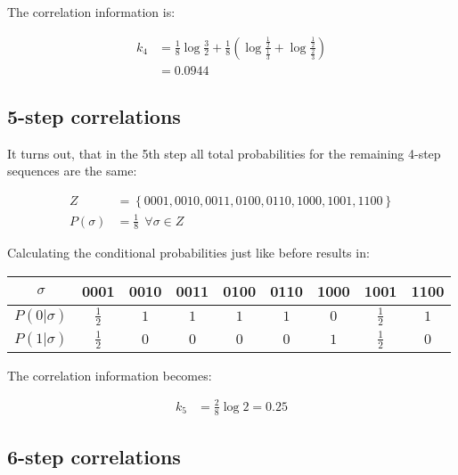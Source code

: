 \documentclass[12pt]{scrartcl}
\begin{document}
The correlation information is:

\begin{equation}\begin{aligned}
k_4 &= \frac{1}{8} \log \frac{3}{2}
+ \frac{1}{8} \left( \log \frac{\frac{1}{2}}{\frac{1}{3}} + \log \frac{\frac{1}{2}}{\frac{2}{3}} \right)\\
&= 0.0944
\end{aligned}\end{equation}

\subsection{5-step correlations}

It turns out, that in the 5th step all total probabilities for the remaining 4-step sequences are the same:

\begin{equation}\begin{aligned}
Z &= \left\{
0001, 0010, 0011, 0100, 0110, 1000, 1001, 1100
\right\}\\
P(\sigma) &= \frac{1}{8} \ \ \forall \sigma \in Z
\end{aligned}\end{equation}

Calculating the conditional probabilities just like before results in:

\begin{table}[!h]
\centering
\begin{tabular}{c||c|c|c|c|c|c|c|c}
$\sigma$ & 0001 & 0010 & 0011 & 0100 & 0110 & 1000 & 1001 & 1100\\ \hline
$P(0|\sigma)$ & $\frac{1}{2}$ & $1$ & $1$ & $1$ & $1$ & $0$ & $\frac{1}{2}$ & $1$\\ \hline
$P(1|\sigma)$ & $\frac{1}{2}$ & $0$ & $0$ & $0$ & $0$ & $1$ & $\frac{1}{2}$ & $0$
\end{tabular}
\end{table}

The correlation information becomes:

\begin{equation}\begin{aligned}
k_5 &= \frac{2}{8} \log 2 = 0.25
\end{aligned}\end{equation}

\subsection{6-step correlations}
\end{document}
